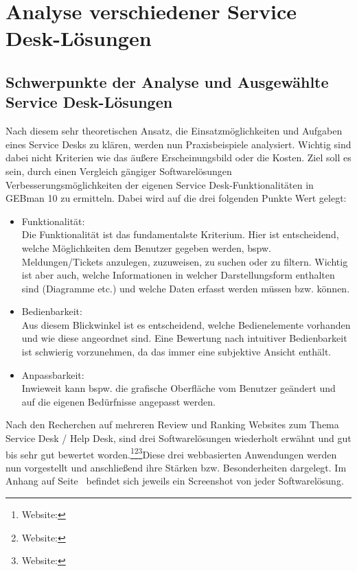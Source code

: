 \section{Analyse verschiedener Service Desk-Lösungen}

\subsection{Schwerpunkte der Analyse und Ausgewählte Service Desk-Lösungen}

\noindent
Nach diesem sehr theoretischen Ansatz, die Einsatzmöglichkeiten und Aufgaben eines Service Desks zu klären, werden nun Praxisbeispiele analysiert. Wichtig sind dabei nicht Kriterien wie das äußere Erscheinungsbild oder die Kosten. Ziel soll es sein, durch einen Vergleich gängiger Softwarelösungen Verbesserungsmöglichkeiten der eigenen Service Desk-Funktionalitäten in GEBman 10 zu ermitteln. Dabei wird auf die drei folgenden Punkte Wert gelegt:

\begin{itemize}
\item Funktionalität:\\
		Die Funktionalität ist das fundamentalste Kriterium. Hier ist entscheidend, welche 			
		Möglichkeiten dem Benutzer gegeben werden, bspw. Meldungen/Tickets anzulegen, zuzuweisen, 
		zu suchen oder zu filtern. Wichtig ist aber auch, welche Informationen in welcher 
		Darstellungsform enthalten sind (Diagramme etc.) und welche Daten erfasst werden müssen 
		bzw. können.\\
		 
\item Bedienbarkeit:\\
		Aus diesem Blickwinkel ist es entscheidend, welche Bedienelemente vorhanden und wie diese angeordnet sind. Eine	
		Bewertung nach intuitiver Bedienbarkeit ist schwierig vorzunehmen, da das immer eine
		subjektive Ansicht enthält.\\
		
\item Anpassbarkeit:\\
		Inwieweit kann bspw. die grafische Oberfläche vom Benutzer geändert und auf die 
		eigenen Bedürfnisse angepasst werden.\\		
\end{itemize}


\noindent
Nach den Recherchen auf mehreren Review und Ranking Websites zum Thema Service Desk / Help Desk, sind drei Softwarelösungen wiederholt erwähnt und gut bis sehr gut bewertet worden.\footnote{Website:\cite{Ranking1}}\footnote{Website:\cite{Ranking2}}\footnote{Website:\cite{Ranking3}}Diese drei webbasierten Anwendungen werden nun vorgestellt und anschließend ihre Stärken bzw. Besonderheiten dargelegt. Im Anhang auf Seite~\pageref{Anhang3} befindet sich jeweils ein Screenshot von jeder Softwarelösung.

